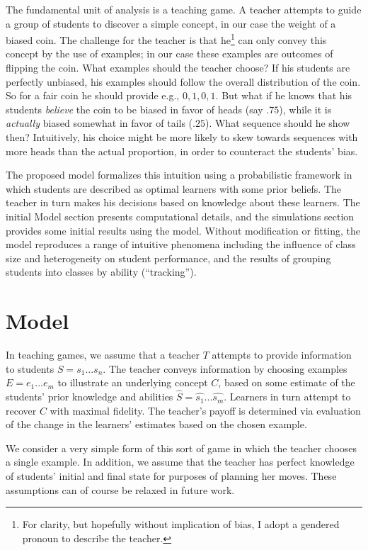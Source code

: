 \documentclass[10pt,letterpaper]{article}
\begin{document}
The fundamental unit of analysis is a teaching game. A teacher attempts to guide a group of students to discover a simple concept, in our case the weight of a biased coin. The challenge for the teacher is that he\footnote{For clarity, but hopefully without implication of bias, I adopt a gendered pronoun to describe the teacher.} can only convey this concept by the use of examples; in our case these examples are outcomes of flipping the coin. What examples should the teacher choose? If his students are perfectly unbiased, his examples should follow the overall distribution of the coin. So for a fair coin he should provide e.g., $0, 1, 0, 1$. But what if he knows that his students \emph{believe} the coin to be biased in favor of heads (say $.75$), while it is \emph{actually} biased somewhat in favor of tails ($.25$). What sequence should he show then? Intuitively, his choice might be more likely to skew towards sequences with more heads than the actual proportion, in order to counteract the students' bias.

The proposed model formalizes this intuition using a probabilistic framework in which students are described as optimal learners with some prior beliefs.  The teacher in turn makes his decisions based on knowledge about these learners. The initial Model section presents computational details, and the simulations section provides some initial results using the model. Without modification or fitting, the model reproduces a range of intuitive phenomena including the influence of class size and heterogeneity on student performance, and the results of grouping students into classes by ability (``tracking''). 

\section{Model}

In teaching games, we assume that a teacher $T$ attempts to provide information to students $S = {s_1 ... s_n}$. The teacher conveys information by choosing examples $E = {e_1 ... e_m}$ to illustrate an underlying concept $C$, based on some estimate of the students' prior knowledge and abilities $\hat{S} = {\hat{s_1} ... \hat{s_m}}$. Learners in turn attempt to recover $C$ with maximal fidelity. The teacher's payoff is determined via evaluation of the change in the learners' estimates based on the chosen example.

We consider a very simple form of this sort of game in which the teacher chooses a single example. In addition, we assume that the teacher has perfect knowledge of students' initial and final state for purposes of planning her moves. These assumptions can of course be relaxed in future work.
\end{document}
